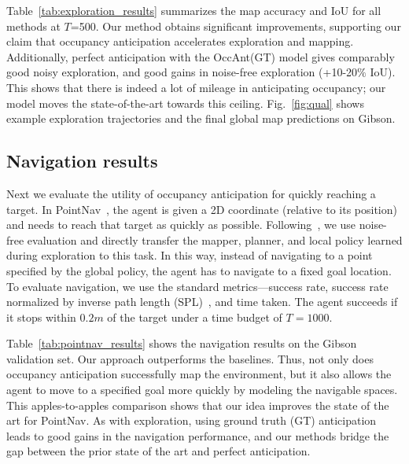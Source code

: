 \documentclass[runningheads]{llncs}
\begin{document}
Table~\ref{tab:exploration_results} summarizes the map accuracy and IoU for all methods at $T$=500. Our method obtains significant improvements, supporting our claim that occupancy anticipation accelerates exploration and mapping. Additionally, perfect anticipation with the OccAnt(GT) model gives comparably good noisy exploration,  and good gains in noise-free exploration (+10-20$\%$  IoU). This shows that there is indeed a lot of mileage in anticipating occupancy; our model moves the state-of-the-art towards this ceiling. Fig.~\ref{fig:qual} shows example exploration trajectories and the final global map predictions on Gibson.




\subsection{Navigation results}\label{sec:exp_navigation}

Next we evaluate the utility of occupancy anticipation for quickly reaching a target. In PointNav~\cite{savva2017minos,anderson2018evaluation}, the agent is given a 2D coordinate (relative to its position) and needs to reach that target as quickly as possible. Following~\cite{chaplot2020learning}, we use noise-free evaluation and directly transfer the mapper, planner, and local policy learned during exploration to this task. In this way, instead of navigating to a point specified by the global policy, the agent has to navigate to a fixed goal location. To evaluate navigation, we use the standard metrics---success rate, success rate normalized by inverse path length (SPL)~\cite{anderson2018evaluation}, and time taken. The agent succeeds if it stops within $0.2\si{m}$ of the target under a time budget of $T=1000$.

Table~\ref{tab:pointnav_results} shows the navigation results on the Gibson validation set. Our approach outperforms the baselines. Thus, not only does occupancy anticipation successfully map the environment, but it also allows the agent to move to a specified goal more quickly by modeling the navigable spaces. This apples-to-apples comparison shows that our idea improves the state of the art for PointNav. As with exploration, using ground truth (GT) anticipation leads to good gains in the navigation performance, and our methods bridge the gap between the prior state of the art and perfect anticipation.
\end{document}
